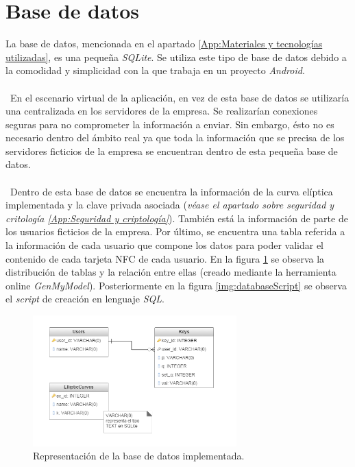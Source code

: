 \documentclass[../PFC.tex]{subfiles}
\begin{document}
\section{Base de datos}
\label{App:Base de datos}

La base de datos, mencionada en el apartado \ref{App:Materiales y tecnologías utilizadas}, es una pequeña \textit{SQLite}. Se utiliza este tipo de base de datos debido a la comodidad y simplicidad con la que trabaja en un proyecto \textit{Android}.
\\\\\
En el escenario virtual de la aplicación, en vez de esta base de datos se utilizaría una centralizada en los servidores de la empresa. Se realizarían conexiones seguras para no comprometer la información a enviar. Sin embargo, ésto no es necesario dentro del ámbito real ya que toda la información que se precisa de los servidores ficticios de la empresa se encuentran dentro de esta pequeña base de datos.
\\\\\
Dentro de esta base de datos se encuentra la información de la curva elíptica implementada y la clave privada asociada (\textit{véase el apartado sobre seguridad y critología \ref{App:Seguridad y criptología}}). También está la información de parte de los usuarios ficticios de la empresa. Por último, se encuentra una tabla referida a la información de cada usuario que compone los datos para poder validar el contenido de cada tarjeta NFC de cada usuario. En la figura \ref{img:database} se observa la distribución de tablas y la relación entre ellas (creado mediante la herramienta online \textit{GenMyModel}\cite{diagramaDBOnline}). Posteriormente en la figura \ref{img:databaseScript} se observa el \textit{script} de creación en lenguaje \textit{SQL}.

\begin{figure}[H]
  \centering
  \includegraphics[width=0.7\textwidth]{./img/database}
  \caption{Representación de la base de datos implementada.}
  \label{img:database}
\end{figure}
\end{document}
